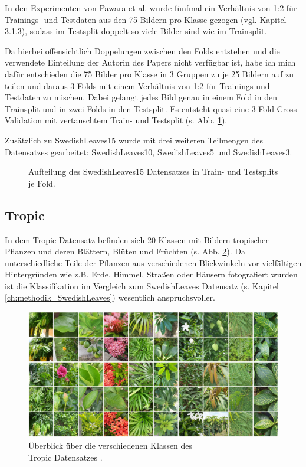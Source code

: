In den Experimenten von Pawara et al. \cite{pawaraPaper} wurde fünfmal ein Verhältnis von 1:2 für Trainings- und Testdaten aus den 75 Bildern pro Klasse gezogen (vgl. \cite{pawaraPaper} Kapitel 3.1.3), sodass im Testsplit doppelt so viele Bilder sind wie im Trainsplit.

Da hierbei offensichtlich Doppelungen zwischen den Folds entstehen und die verwendete Einteilung der Autorin des Papers \cite{pawaraPaper} nicht verfügbar ist, habe ich mich dafür entschieden die 75 Bilder pro Klasse in 3 Gruppen zu je 25 Bildern auf zu teilen und daraus 3 Folds mit einem Verhältnis von 1:2 für Trainings und Testdaten zu mischen. Dabei gelangt jedes Bild genau in einem Fold in den Trainsplit und in zwei Folds in den Testsplit. Es entsteht quasi eine 3-Fold Cross Validation mit vertauschtem Train- und Testsplit (s. Abb. \ref{fig:swedishLeavesZusammensetzung}).

Zusätzlich zu SwedishLeaves15 wurde mit drei weiteren Teilmengen des Datensatzes gearbeitet: SwedishLeaves10, SwedishLeaves5 und SwedishLeaves3.

\begin{figure}[H]
\begin{adjustbox}{width=1.4\textwidth, center}

\end{adjustbox}
\caption{Aufteilung des SwedishLeaves15 Datensatzes \cite{swedishLeaves} in Train- und Testsplits je Fold.}
\label{fig:swedishLeavesZusammensetzung}
\end{figure}
\newpage
\subsection{Tropic}
\label{ch:methodik_Tropic}
In dem Tropic Datensatz \cite{pawaraWebsiteDatensaetze} befinden sich 20 Klassen mit Bildern tropischer Pflanzen und deren Blättern, Blüten und Früchten (s. Abb. \ref{fig:tropicUeberblick}). Da unterschiedliche Teile der Pflanzen aus verschiedenen Blickwinkeln vor vielfältigen Hintergründen wie z.B. Erde, Himmel, Straßen oder Häusern fotografiert wurden ist die Klassifikation im Vergleich zum SwedishLeaves Datensatz \cite{swedishLeaves} (s. Kapitel \ref{ch:methodik_SwedishLeaves}) wesentlich anspruchsvoller.


\begin{figure}[H]
\centering
\includegraphics[scale=0.14]{img/2_tropic10-image.jpg}
\caption{Überblick über die verschiedenen Klassen des\\
Tropic Datensatzes \cite{pawaraTropic}.}
\label{fig:tropicUeberblick}
\end{figure}

